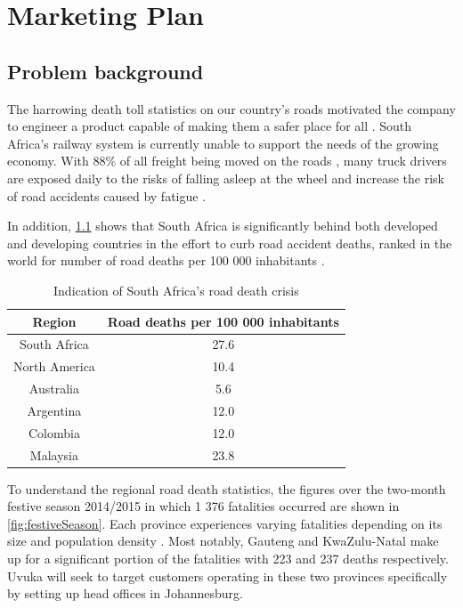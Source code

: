 \newpage
\chapter{Marketing Plan}
\section{Problem background}
The harrowing death toll statistics on our country's roads motivated the company to engineer a product capable of making them a safer place for all \cite{EWNRoadDeaths}. South Africa's railway system is currently unable to support the needs of the growing economy. With 88\% of all freight being moved on the roads \cite{BDlive_freight}, many truck drivers are exposed daily to the risks of falling asleep at the wheel \cite{ArriveAliveDriverTiredness} and increase the risk of road accidents caused by fatigue \cite{News24TruckersSleeping}.

In addition, \cref{tab:deaths100thousand} shows that South Africa is significantly behind both developed and developing countries in the effort to curb road accident deaths, ranked  in the world for number of road deaths per 100 000 inhabitants \cite{deathsPer100thousandStats}.

\begin{table}[htbp]
  \centering
  \caption{Indication of South Africa's road death crisis}
    \begin{tabular}{cc}
    \toprule
    \textbf{Region} & \textbf{Road deaths per 100 000 inhabitants} \\
    \midrule
    South Africa & 27.6 \\
    North America & 10.4 \\
    Australia & 5.6 \\
    Argentina & 12.0 \\
    Colombia & 12.0 \\
    Malaysia & 23.8 \\
    \bottomrule
    \end{tabular}%
  \label{tab:deaths100thousand}%
\end{table}%

To understand the regional road death statistics, the figures over the two-month festive season 2014/2015 in which 1 376 fatalities occurred are shown in \cref{fig:festiveSeason}. Each province experiences varying fatalities depending on its size and population density \cite{ProvincialFestiveStats}. Most notably, Gauteng and KwaZulu-Natal make up for a significant portion of the fatalities with 223 and 237 deaths respectively. Uvuka will seek to target customers operating in these two provinces specifically by setting up head offices in Johannesburg.

